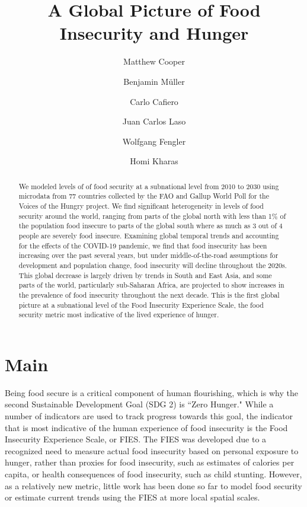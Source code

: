 \documentclass{article}
\begin{document}
\title{A Global Picture of Food Insecurity and Hunger}

\author[1,2,*]{Matthew Cooper}
\author[2,3]{Benjamin Müller}
\author[4]{Carlo Cafiero}
\author[2,5]{Juan Carlos Laso}
\author[2,6]{Wolfgang Fengler}
\author[2,7]{Homi Kharas}


\maketitle
\begin{abstract}
We modeled levels of of food security at a subnational level from 2010 to 2030 using microdata from 77 countries collected by the FAO and Gallup World Poll for the Voices of the Hungry project.  We find significant heterogeneity in levels of food security around the world, ranging from parts of the global north with less than 1\% of the population food insecure to parts of the global south where as much as 3 out of 4 people are severely food insecure.  Examining global temporal trends and accounting for the effects of the COVID-19 pandemic, we find that food insecurity has been increasing over the past several years, but under middle-of-the-road assumptions for development and population change, food insecurity will decline throughout the 2020s.  This global decrease is largely driven by trends in South and East Asia, and some parts of the world, particularly sub-Saharan Africa, are projected to show increases in the prevalence of food insecurity throughout the next decade. This is the first global picture at a subnational level of the Food Insecurity Experience Scale, the food security metric most indicative of the lived experience of hunger.
\end{abstract}

\section{Main}
Being food secure is a critical component of human flourishing, which is why the second Sustainable Development Goal (SDG 2) is ``Zero Hunger."  While a number of indicators are used to track progress towards this goal, the indicator that is most indicative of the human experience of food insecurity is the Food Insecurity Experience Scale, or FIES.  The FIES was developed due to a recognized need to measure actual food insecurity based on personal exposure to hunger, rather than proxies for food insecurity, such as estimates of calories per capita, or health consequences of food insecurity, such as child stunting.  However, as a relatively new metric, little work has been done so far to model food security or estimate current trends using the FIES at more local spatial scales.
\end{document}
